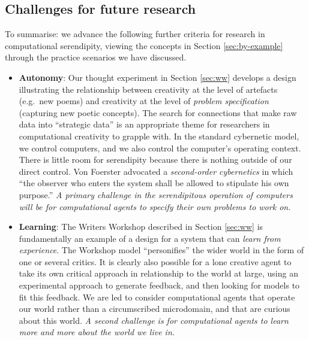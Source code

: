 \subsection{Challenges for future research} \label{sec:recommendations}

To summarise: we advance the following further criteria for research
in computational serendipity, viewing the concepts in Section
\ref{sec:by-example} through the practice scenarios we have discussed.

\begin{itemize}
\item \textbf{Autonomy}: Our thought experiment in Section
  \ref{sec:ww} develops a design illustrating the relationship between
  creativity at the level of artefacts (e.g.~new poems) and creativity
  at the level of \emph{problem specification} (capturing new poetic
  concepts).  The search for connections that make raw data into
  ``strategic data'' is an appropriate theme for researchers in
  computational creativity to grapple with.  In the standard
  cybernetic model, we control computers, and we also control the
  computer's operating context.  There is little room for serendipity
  because there is nothing outside of our direct control. Von Foerster
  \citeyear[p. 286]{von2003cybernetics} advocated a \emph{second-order
    cybernetics} in which ``the observer who enters the system shall
  be allowed to stipulate his own purpose.''  \emph{A primary
    challenge in the serendipitous operation of computers will be for
    computational agents to specify their own problems to work on.}
\end{itemize}

\begin{itemize}
\item \textbf{Learning}: The Writers Workshop described in Section
  \ref{sec:ww} is fundamentally an example of a design for a system
  that can \emph{learn from experience}.  The Workshop model
  ``personifies'' the wider world in the form of one or several
  critics.  It is clearly also possible for a lone creative agent to
  take its own critical approach in relationship to the world at
  large, using an experimental approach to generate feedback, and then
  looking for models to fit this feedback.   We are led to consider 
  computational agents that operate our world rather
  than a circumscribed microdomain, and that are curious about this
  world.  \emph{A second challenge is for computational agents to
    learn more and more about the world we live in.}
\end{itemize}

